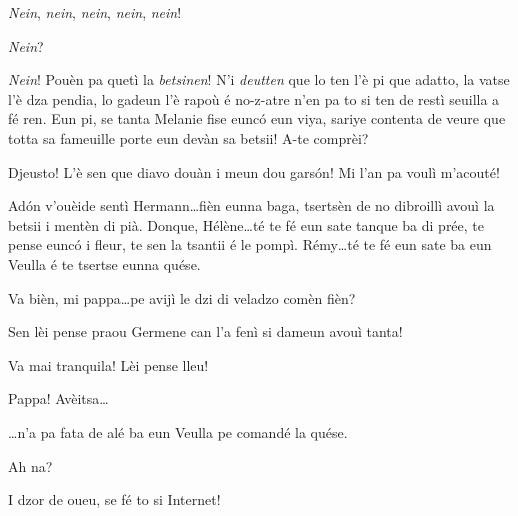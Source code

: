 \begin{drama}
\Hermannspeaks \textit{Nein}, \textit{nein}, \textit{nein}, \textit{nein}, \textit{nein}!

\Cesarspeaks{} \textit{Nein}?

\Hermannspeaks{} \textit{Nein}! Pouèn pa quetì la \textit{betsinen}! N'i \textit{deutten} que lo ten l'è pi que adatto, la vatse l'è dza pendia, lo gadeun l'è rapoù é no-z-atre n'en pa to si ten de restì seuilla a fé ren. Eun pi, se tanta Melanie fise eunc\'o eun viya, sariye contenta de veure que totta sa fameuille porte eun devàn sa betsii!  A-te comprèi?

\Cesarspeaks{} Djeusto! L'è sen que diavo douàn i meun dou gars\'on! Mi l'an pa voulì m'acouté!


\Cesarspeaks{} Ad\'on v'ouèide sentì Hermann\ldots fièn eunna baga, tsertsèn de no dibroillì avouì la betsii i mentèn di pià. Donque, Hélène\ldots té te fé eun sate tanque ba di prée, te pense eunc\'o i fleur, te sen la tsantii é le pompì. Rémy\ldots té te fé eun sate ba eun Veulla é te tsertse eunna quése.


\Helenespeaks Va bièn, mi pappa\ldots pe avijì le dzi di veladzo comèn fièn?

\Cesarspeaks   Sen lèi pense praou Germene  can l'a fenì si dameun avouì tanta!

\Battistaspeaks{} Va mai tranquila! Lèi pense lleu!




\Remyspeaks  Pappa! Avèitsa\ldots


\Remyspeaks \ldots n’a pa fata de alé ba 
eun Veulla pe comandé la quése.

\Cesarspeaks Ah na?

\Remyspeaks I dzor de oueu, se fé to si Internet! 


\end{drama}
